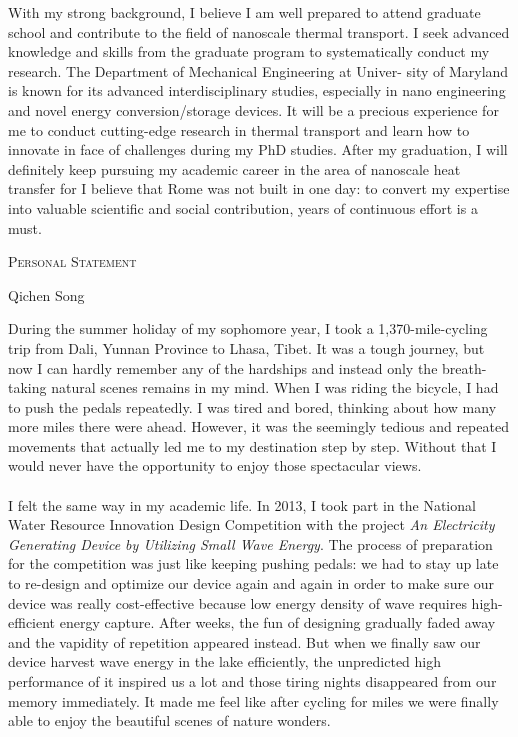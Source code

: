 \documentclass[a4paper,10pt]{article}
\begin{document}
\begin{spacing}{1.5}
With my strong background, I believe I am well prepared to attend graduate school and contribute to the field of nanoscale thermal transport. I seek advanced knowledge and skills from the graduate program to systematically conduct my research. The Department of Mechanical Engineering at Univer- sity of Maryland is known for its advanced interdisciplinary studies, especially in nano engineering and novel energy conversion/storage devices. It will be a precious experience for me to conduct cutting-edge research in thermal transport and learn how to innovate in face of challenges during my PhD studies. After my graduation, I will definitely keep pursuing my academic career in the area of nanoscale heat transfer for I believe that Rome was not built in one day: to convert my expertise into valuable scientific and social contribution, years of continuous effort is a must.\\
\newpage
\begin{center} {  \vspace{5em}  }  \end{center}
\begin{center} {\par\LARGE{\textsc{Personal Statement}}}  \end{center}%
\begin{center} {\large {Qichen Song}     }  \end{center}
\vspace{2.0em}
During the summer holiday of my sophomore year, I took a 1,370-mile-cycling trip from Dali, Yunnan Province to Lhasa, Tibet. It was a tough journey, but now I can hardly remember any of the hardships and instead only the breath-taking natural scenes remains in my mind. When I was riding the bicycle, I had to push the pedals repeatedly. I was tired and bored, thinking about how many more miles there were ahead. However, it was the seemingly tedious and repeated movements that actually led me to my destination step by step. Without that I would never have the opportunity to enjoy those spectacular views.\\
\\
I felt the same way in my academic life. In 2013, I took part in the National Water Resource Innovation Design Competition with the project \emph{An Electricity Generating Device by Utilizing Small Wave Energy}. The process of preparation for the competition was just like keeping pushing pedals: we had to stay up late to re-design and optimize our device again and again in order to make sure our device was really cost-effective because low energy density of wave requires high-efficient energy capture. After weeks, the fun of designing gradually faded away and the vapidity of repetition appeared instead. But when we finally saw our device harvest wave energy in the lake efficiently, the unpredicted high performance of it inspired us a lot and those tiring nights disappeared from our memory immediately. It made me feel like after cycling for miles we were finally able to enjoy the beautiful scenes of nature wonders.\\

\end{spacing}
\end{document}
